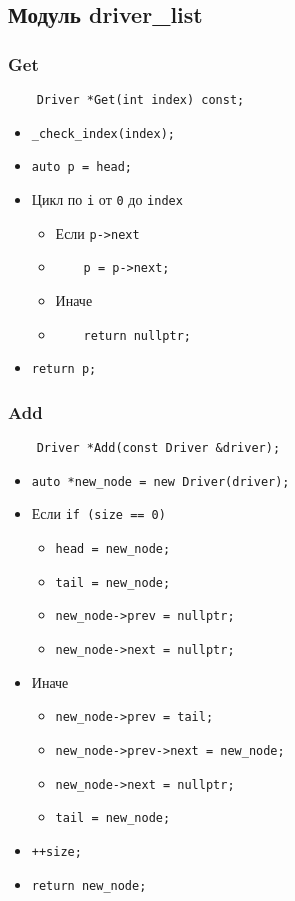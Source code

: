 \subsection{Модуль driver\_list}

\subsubsection{Get}

\begin{lstlisting}
    Driver *Get(int index) const;
\end{lstlisting}

\begin{itemize}
    \item \verb|_check_index(index);|
    \item \verb|auto p = head;|
    \item Цикл по \verb|i| от \verb|0| до \verb|index|
        \begin{itemize}
            \item Если \verb|p->next|
            \item \ \ \ \ \verb|p = p->next;|
            \item Иначе
            \item \ \ \ \ \verb|return nullptr;|
        \end{itemize}
    \item \verb|return p;|
\end{itemize}

\subsubsection{Add}

\begin{lstlisting}
    Driver *Add(const Driver &driver);
\end{lstlisting}

\begin{itemize}
    \item \verb|auto *new_node = new Driver(driver);|
    \item Если \verb|if (size == 0)|
    \begin{itemize}
        \item \verb|head = new_node;|
        \item \verb|tail = new_node;|
        \item \verb|new_node->prev = nullptr;|
        \item \verb|new_node->next = nullptr;|
    \end{itemize}
    \item Иначе
    \begin{itemize}
        \item \verb|new_node->prev = tail;|
        \item \verb|new_node->prev->next = new_node;|
        \item \verb|new_node->next = nullptr;|
        \item \verb|tail = new_node;|
    \end{itemize}
    \item \verb|++size;|
    \item \verb|return new_node;|
\end{itemize}


